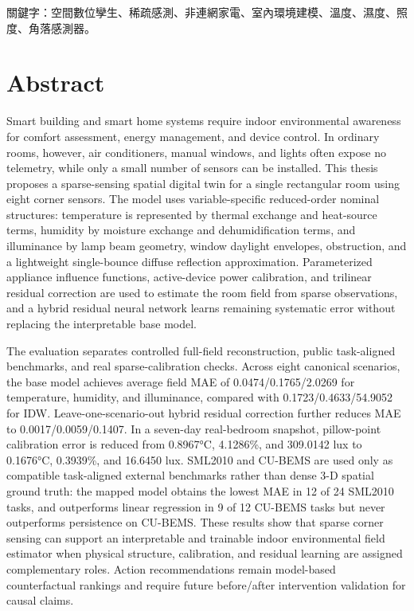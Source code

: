 \documentclass[12pt,a4paper]{article}
\begin{document}
關鍵字：空間數位孿生、稀疏感測、非連網家電、室內環境建模、溫度、濕度、照度、角落感測器。


\clearpage

\section*{Abstract}

Smart building and smart home systems require indoor environmental awareness for comfort assessment, energy management, and device control. In ordinary rooms, however, air conditioners, manual windows, and lights often expose no telemetry, while only a small number of sensors can be installed. This thesis proposes a sparse-sensing spatial digital twin for a single rectangular room using eight corner sensors. The model uses variable-specific reduced-order nominal structures: temperature is represented by thermal exchange and heat-source terms, humidity by moisture exchange and dehumidification terms, and illuminance by lamp beam geometry, window daylight envelopes, obstruction, and a lightweight single-bounce diffuse reflection approximation. Parameterized appliance influence functions, active-device power calibration, and trilinear residual correction are used to estimate the room field from sparse observations, and a hybrid residual neural network learns remaining systematic error without replacing the interpretable base model.


The evaluation separates controlled full-field reconstruction, public task-aligned benchmarks, and real sparse-calibration checks. Across eight canonical scenarios, the base model achieves average field MAE of 0.0474/0.1765/2.0269 for temperature, humidity, and illuminance, compared with 0.1723/0.4633/54.9052 for IDW. Leave-one-scenario-out hybrid residual correction further reduces MAE to 0.0017/0.0059/0.1407. In a seven-day real-bedroom snapshot, pillow-point calibration error is reduced from 0.8967°C, 4.1286\%, and 309.0142 lux to 0.1676°C, 0.3939\%, and 16.6450 lux. SML2010 and CU-BEMS are used only as compatible task-aligned external benchmarks rather than dense 3-D spatial ground truth: the mapped model obtains the lowest MAE in 12 of 24 SML2010 tasks, and outperforms linear regression in 9 of 12 CU-BEMS tasks but never outperforms persistence on CU-BEMS. These results show that sparse corner sensing can support an interpretable and trainable indoor environmental field estimator when physical structure, calibration, and residual learning are assigned complementary roles. Action recommendations remain model-based counterfactual rankings and require future before/after intervention validation for causal claims.
\end{document}
